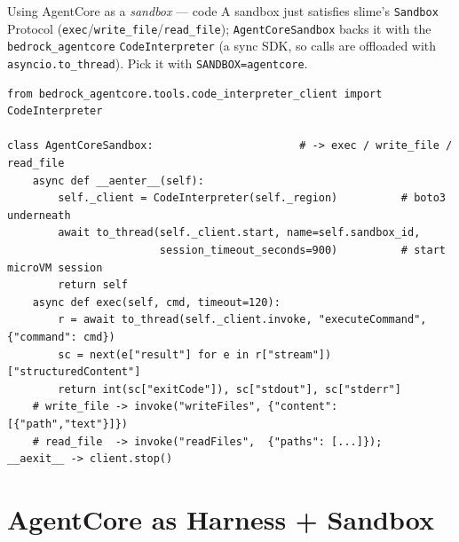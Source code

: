 \documentclass[aspectratio=169]{beamer}
\begin{document}
\begin{frame}[fragile]{Using AgentCore as a \emph{sandbox} --- code}
  \footnotesize A sandbox just satisfies slime's \texttt{Sandbox} Protocol
  (\texttt{exec}/\texttt{write\_file}/\texttt{read\_file}); \texttt{AgentCoreSandbox} backs it with the
  \texttt{bedrock\_agentcore} \texttt{CodeInterpreter} (a sync SDK, so calls are offloaded with
  \texttt{asyncio.to\_thread}). Pick it with \texttt{SANDBOX=agentcore}.
\begin{lstlisting}[basicstyle=\ttfamily\scriptsize]
from bedrock_agentcore.tools.code_interpreter_client import CodeInterpreter

class AgentCoreSandbox:                       # -> exec / write_file / read_file
    async def __aenter__(self):
        self._client = CodeInterpreter(self._region)          # boto3 underneath
        await to_thread(self._client.start, name=self.sandbox_id,
                        session_timeout_seconds=900)          # start microVM session
        return self
    async def exec(self, cmd, timeout=120):
        r = await to_thread(self._client.invoke, "executeCommand", {"command": cmd})
        sc = next(e["result"] for e in r["stream"])["structuredContent"]
        return int(sc["exitCode"]), sc["stdout"], sc["stderr"]
    # write_file -> invoke("writeFiles", {"content": [{"path","text"}]})
    # read_file  -> invoke("readFiles",  {"paths": [...]});   __aexit__ -> client.stop()
\end{lstlisting}
\end{frame}

\section{AgentCore as Harness + Sandbox}
\end{document}

